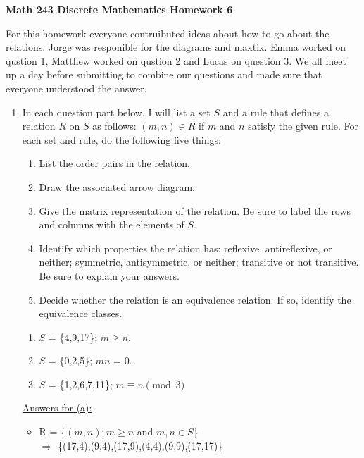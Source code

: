 \documentclass{article}
\begin{document}
\noindent\textbf{Math 243 Discrete Mathematics \hfill Homework 6}

For this homework everyone contruibuted ideas about how to go about the relations. Jorge was responible for the diagrams and maxtix. 
Emma worked on qustion 1, Matthew worked on qustion 2 and Lucas on question 3. We all meet up a day before submitting to combine our questions and made
sure that everyone understood the answer. 


\pagebreak

\begin{enumerate}
    \item In each question part below, I will list a set $\mathit{S}$ and 
    a rule that defines a relation $\mathit{R}$ on $\mathit{S}$ as follows: 
    $(\mathit{m,n}) \in R$ if $\mathit{m}$ and $\mathit{n}$ satisfy the given rule. 
    For each set and rule, do the following five things: 
\begin{enumerate}[label=\bfseries \roman*]
\item List the order pairs in the relation.
\item Draw the associated arrow diagram.
\item Give the matrix representation of the relation. 
Be sure to label the rows and columns with the elements of $S$.
\item Identify which properties the relation has: reflexive, 
antireflexive, or neither; symmetric, antisymmetric, or neither; 
transitive or not transitive. Be sure to explain your answers.
\item Decide whether the relation is an equivalence relation. 
If so, identify the equivalence classes.     
\end{enumerate}

\begin{enumerate}
    \item $\mathit{S}$ = \{4,9,17\}; $m \geq n$.    
    \item $\mathit{S}$ = \{0,2,5\}; $mn$ = 0.
    \item $\mathit{S}$ = \{1,2,6,7,11\}; $m \equiv n \pmod{3}$
\end{enumerate}

\small
\underline{Answers for (a):}    

\begin{itemize}
    \item R = \{$(m,n):m \geq n$ and $m,n \in S$\}
    \\$\Rightarrow$ \{(17,4),(9,4),(17,9),(4,4),(9,9),(17,17)\}\\
   

\end{itemize}
\end{enumerate}
\end{document}
